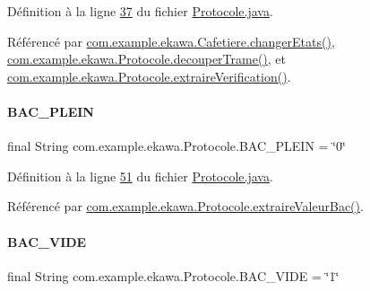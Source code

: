 Définition à la ligne \hyperlink{_protocole_8java_source_l00037}{37} du fichier \hyperlink{_protocole_8java_source}{Protocole.\+java}.



Référencé par \hyperlink{_cafetiere_8java_source_l00463}{com.\+example.\+ekawa.\+Cafetiere.\+changer\+Etats()}, \hyperlink{_protocole_8java_source_l00208}{com.\+example.\+ekawa.\+Protocole.\+decouper\+Trame()}, et \hyperlink{_protocole_8java_source_l00440}{com.\+example.\+ekawa.\+Protocole.\+extraire\+Verification()}.

\mbox{\label{classcom_1_1example_1_1ekawa_1_1_protocole_a499d999d5a6644a3f02bc63bd764e469}} 
\paragraph{\texorpdfstring{B\+A\+C\+\_\+\+P\+L\+E\+IN}{BAC\_PLEIN}}
{\footnotesize\ttfamily final String com.\+example.\+ekawa.\+Protocole.\+B\+A\+C\+\_\+\+P\+L\+E\+IN = \char`\"{}0\char`\"{}\hspace{0.3cm}{\ttfamily [static]}}



Définition à la ligne \hyperlink{_protocole_8java_source_l00051}{51} du fichier \hyperlink{_protocole_8java_source}{Protocole.\+java}.



Référencé par \hyperlink{_protocole_8java_source_l00277}{com.\+example.\+ekawa.\+Protocole.\+extraire\+Valeur\+Bac()}.

\mbox{\label{classcom_1_1example_1_1ekawa_1_1_protocole_a790736e534bd8f87d62c5e1bdb759f45}} 
\paragraph{\texorpdfstring{B\+A\+C\+\_\+\+V\+I\+DE}{BAC\_VIDE}}
{\footnotesize\ttfamily final String com.\+example.\+ekawa.\+Protocole.\+B\+A\+C\+\_\+\+V\+I\+DE = \char`\"{}1\char`\"{}\hspace{0.3cm}{\ttfamily [static]}}




